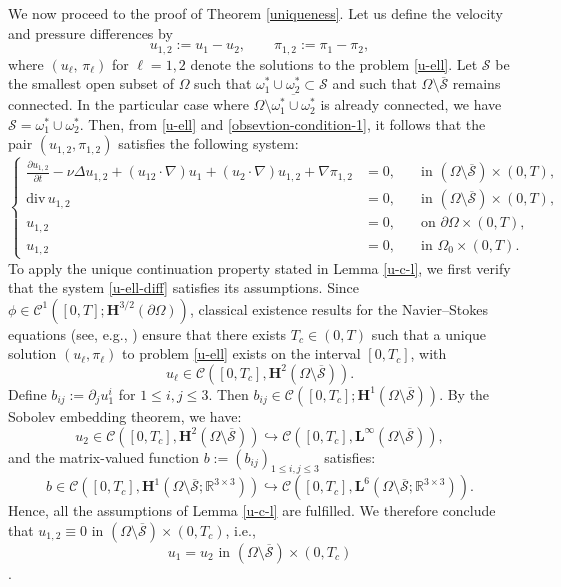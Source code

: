 \documentclass[a4paper,12pt,reqno,natbib]{amsart}
\def\S{\mathcal S}
\def\H{\textbf{H}}
\def\L{\textbf{L}}
\begin{document}
We now proceed to the proof of Theorem \ref{uniqueness}. Let us define the velocity and pressure differences by
$$
u_{1,2} := u_1 - u_2, \qquad \pi_{1,2} := \pi_1 - \pi_2,
$$
where \( (u_\ell,\,\pi_\ell) \) for \( \ell = 1,2 \) denote the solutions to the problem \eqref{u-ell}. Let \( \mathcal{S} \) be the smallest open subset of \( \Omega \) such that \( \omega_1^* \cup \omega_2^* \subset \mathcal{S} \) and such that \( \Omega \setminus \overline{\mathcal{S}} \) remains connected. In the particular case where \( \Omega \setminus \overline{\omega_1^* \cup \omega_2^*} \) is already connected, we have \( \mathcal{S} = \omega_1^* \cup \omega_2^* \). Then, from \eqref{u-ell} and \eqref{obsevtion-condition-1}, it follows that the pair \( (u_{1,2}, \pi_{1,2}) \) satisfies the following system:
\begin{equation}\label{u-ell-diff}
    \left\{
    \begin{array}{rll}
        \displaystyle \frac{\partial u_{1,2}}{\partial t} - \nu \Delta u_{1,2} +(u_{12}\cdot\nabla)u_1+(u_2\cdot\nabla)u_{1,2} + \nabla \pi_{1,2}
        &=0, &\quad \text{in } (\Omega \setminus \overline{\S}) \times (0, T), \\[8pt]
        \text{div}\, u_{1,2} &= 0, &\quad \text{in } (\Omega \setminus \overline{\S}) \times (0, T), \\[8pt]
        u_{1,2} &=0, &\quad \text{on } \partial\Omega \times (0, T),\\[8pt]
        u_{1,2} &=0, &\quad \text{in } \Omega_0 \times (0, T).
    \end{array}
    \right.
    \end{equation}
To apply the unique continuation property stated in Lemma \ref{u-c-l}, we first verify that the system \eqref{u-ell-diff} satisfies its assumptions. Since \( \phi \in  \mathcal{C}^1([0,T];\H^{3/2}(\partial \Omega)) \), classical existence results for the Navier--Stokes equations (see, e.g., \cite[Lemma 25.2, p. 144]{tartar2006introduction}) ensure that there exists \( T_c \in (0, T) \) such that a unique solution \( (u_\ell, \pi_\ell) \) to problem \eqref{u-ell} exists on the interval \( [0, T_c] \), with
\[
u_\ell \in \mathcal{C}\left([0, T_c], \H^2(\Omega \setminus \overline{\mathcal{S}})\right).
\]
Define \( b_{ij} := \partial_j u_1^i \) for \( 1 \leq i,j \leq 3 \). Then \( b_{ij} \in \mathcal{C}\left([0, T_c] ; \H^1(\Omega \setminus \overline{\mathcal{S}})\right) \). By the Sobolev embedding theorem, we have:
\[
u_2 \in \mathcal{C}\left([0, T_c], \H^2(\Omega \setminus \overline{\mathcal{S}})\right) \hookrightarrow \mathcal{C}\left([0, T_c], \L^{\infty}(\Omega \setminus \overline{\mathcal{S}})\right),
\]
and the matrix-valued function \( b := (b_{ij})_{1 \leq i,j \leq 3} \) satisfies:
\[
b \in \mathcal{C}\left([0, T_c], \H^1(\Omega \setminus \overline{\mathcal{S}}; \mathbb{R}^{3 \times 3})\right) \hookrightarrow \mathcal{C}\left([0, T_c], \L^6(\Omega \setminus \overline{\mathcal{S}}; \mathbb{R}^{3 \times 3})\right).
\]
Hence, all the assumptions of Lemma \ref{u-c-l} are fulfilled. We therefore conclude that \( u_{1,2} \equiv 0 \) in \( (\Omega \setminus \overline{\mathcal{S}}) \times (0, T_c) \), i.e., \[u_1 = u_2  \text{   in   } (\Omega \setminus \overline{\mathcal{S}}) \times (0, T_c) \].
\end{document}
